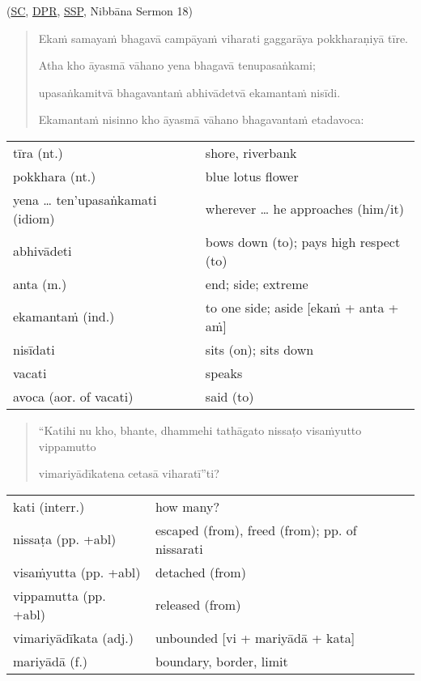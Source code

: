 \documentclass[11pt,oneside]{memoir}
\begin{document}
\casesLegendHeaderBGHere

(\href{https://suttacentral.net/an10.81/pli/ms}{SC}, \href{https://www.digitalpalireader.online/\_dprhtml/index.html?loc=a.9.0.0.1.3.0.m}{DPR}, \href{http://localhost:4848/suttas/an10.81/pli/ms?window\_type=Sutta+Study}{SSP}, Nibbāna Sermon 18)

\begin{quote}
Ekaṁ samayaṁ bhagavā campāyaṁ viharati gaggarāya pokkharaṇiyā tīre.

Atha kho āyasmā vāhano yena bhagavā tenupasaṅkami;

upasaṅkamitvā bhagavantaṁ abhivādetvā ekamantaṁ nisīdi.

Ekamantaṁ nisinno kho āyasmā vāhano bhagavantaṁ etadavoca:
\end{quote}

\begin{longtable}{L{\colOne} L{\colTwo}}
tīra (nt.) & shore, riverbank\\[0pt]
pokkhara (nt.) & blue lotus flower\\[0pt]
yena \ldots{} ten'upasaṅkamati (idiom) & wherever \ldots{} he approaches (him/it)\\[0pt]
abhivādeti & bows down (to); pays high respect (to)\\[0pt]
anta (m.) & end; side; extreme\\[0pt]
ekamantaṁ (ind.) & to one side; aside [ekaṁ + anta + aṁ]\\[0pt]
nisīdati & sits (on); sits down\\[0pt]
vacati & speaks\\[0pt]
avoca (aor. of vacati) & said (to)\\[0pt]
\end{longtable}

\begin{quote}
“Katihi nu kho, bhante, dhammehi tathāgato nissaṭo visaṁyutto vippamutto

vimariyādīkatena cetasā viharatī”ti?
\end{quote}

\begin{longtable}{L{\colOne} L{\colTwo}}
kati (interr.) & how many?\\[0pt]
nissaṭa (pp. +abl) & escaped (from), freed (from); pp. of nissarati\\[0pt]
visaṁyutta (pp. +abl) & detached (from)\\[0pt]
vippamutta (pp. +abl) & released (from)\\[0pt]
vimariyādīkata (adj.) & unbounded [vi + mariyādā + kata]\\[0pt]
mariyādā (f.) & boundary, border, limit\\[0pt]
\end{longtable}
\end{document}
